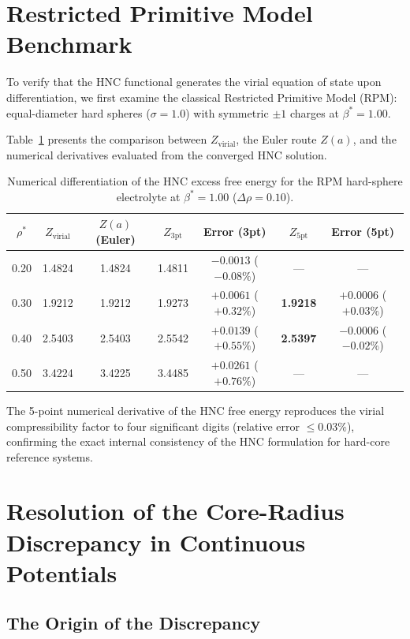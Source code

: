 \documentclass[11pt,a4paper]{article}
\begin{document}
\section{Restricted Primitive Model Benchmark}

To verify that the HNC functional generates the virial equation of state upon differentiation, we first examine the classical Restricted Primitive Model (RPM): equal-diameter hard spheres ($\sigma = 1.0$) with symmetric $\pm 1$ charges at $\beta^* = 1.00$.

Table~\ref{tab:rpm_benchmark} presents the comparison between $Z_{\text{virial}}$, the Euler route $Z(a)$, and the numerical derivatives evaluated from the converged HNC solution.

\begin{table}[htbp]
\centering
\caption{Numerical differentiation of the HNC excess free energy for the RPM hard-sphere electrolyte at $\beta^* = 1.00$ ($\Delta\rho = 0.10$).}
\label{tab:rpm_benchmark}
\small
\begin{tabular}{ccccccc}
\toprule
$\rho^*$ & $Z_{\text{virial}}$ & $Z(a)$ (Euler) & $Z_{\text{3pt}}$ & Error (3pt) & $Z_{\text{5pt}}$ & Error (5pt) \\
\midrule
0.20 & 1.4824 & 1.4824 & 1.4811 & $-0.0013$ ($-0.08\%$) & — & — \\
0.30 & 1.9212 & 1.9212 & 1.9273 & $+0.0061$ ($+0.32\%$) & \textbf{1.9218} & $\mathbf{+0.0006}$ ($\mathbf{+0.03\%}$) \\
0.40 & 2.5403 & 2.5403 & 2.5542 & $+0.0139$ ($+0.55\%$) & \textbf{2.5397} & $\mathbf{-0.0006}$ ($\mathbf{-0.02\%}$) \\
0.50 & 3.4224 & 3.4225 & 3.4485 & $+0.0261$ ($+0.76\%$) & — & — \\
\bottomrule
\end{tabular}
\end{table}

The 5-point numerical derivative of the HNC free energy reproduces the virial compressibility factor to four significant digits (relative error $\le 0.03\%$), confirming the exact internal consistency of the HNC formulation for hard-core reference systems.


\section{Resolution of the Core-Radius Discrepancy in Continuous Potentials}

\subsection{The Origin of the Discrepancy}
\end{document}
